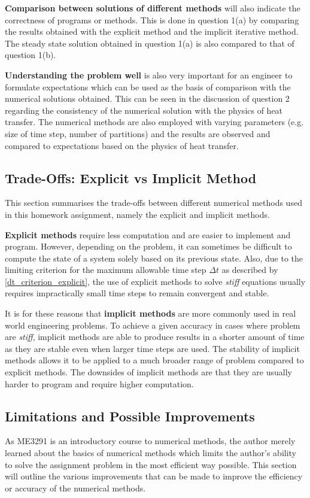 \documentclass[a4paper]{article}
\begin{document}
		\textbf{Comparison between solutions of different methods} will also indicate the correctness of programs or methods. This is done in question 1(a) by comparing the results obtained with the explicit method and the implicit iterative method. The steady state solution obtained in question 1(a) is also compared to that of question 1(b).
		
		\textbf{Understanding the problem well} is also very important for an engineer to formulate expectations which can be used as the basis of comparison with the numerical solutions obtained. This can be seen in the discussion of question 2 regarding the consistency of the numerical solution with the physics of heat transfer. The numerical methods are also employed with varying parameters (e.g. size of time step, number of partitions) and the results are observed and compared to expectations based on the physics of heat transfer.
		
	\subsection{Trade-Offs: Explicit vs Implicit Method}
		This section summarises the trade-offs between different numerical methods used in this homework assignment, namely the explicit and implicit methods.
		
		\textbf{Explicit methods} require less computation and are easier to implement and program. However, depending on the problem, it can sometimes be difficult to compute the state of a system solely based on its previous state. Also, due to the limiting criterion for the maximum allowable time step $\Delta t$ as described by \autoref{dt_criterion_explicit}, the use of explicit methods to solve \textit{stiff} equations usually requires impractically small time steps to remain convergent and stable.
		
		It is for these reasons that \textbf{implicit methods} are more commonly used in real world engineering problems. To achieve a given accuracy in cases where problem are \emph{stiff}, implicit methods are able to produce results in a shorter amount of time as they are stable even when larger time steps are used. The stability of implicit methods allows it to be applied to a much broader range of problem compared to explicit methods. The downsides of implicit methods are that they are usually harder to program and require higher computation.
		
	\subsection{Limitations and Possible Improvements}
		As ME3291 is an introductory course to numerical methods, the author merely learned about the basics of numerical methods which limits the author's ability to solve the assignment problem in the most efficient way possible. This section will outline the various improvements that can be made to improve the efficiency or accuracy of the numerical methods.
		
\end{document}
